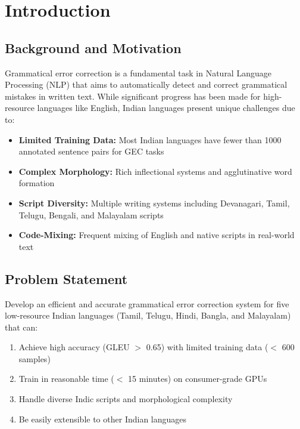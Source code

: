 \documentclass[12pt,a4paper]{article}
\begin{document}
\newpage

\section{Introduction}

\subsection{Background and Motivation}
Grammatical error correction is a fundamental task in Natural Language Processing (NLP) that aims to automatically detect and correct grammatical mistakes in written text. While significant progress has been made for high-resource languages like English, Indian languages present unique challenges due to:

\begin{itemize}
    \item \textbf{Limited Training Data:} Most Indian languages have fewer than 1000 annotated sentence pairs for GEC tasks
    \item \textbf{Complex Morphology:} Rich inflectional systems and agglutinative word formation
    \item \textbf{Script Diversity:} Multiple writing systems including Devanagari, Tamil, Telugu, Bengali, and Malayalam scripts
    \item \textbf{Code-Mixing:} Frequent mixing of English and native scripts in real-world text
\end{itemize}

\subsection{Problem Statement}
Develop an efficient and accurate grammatical error correction system for five low-resource Indian languages (Tamil, Telugu, Hindi, Bangla, and Malayalam) that can:
\begin{enumerate}
    \item Achieve high accuracy (GLEU $>$ 0.65) with limited training data ($<$ 600 samples)
    \item Train in reasonable time ($<$ 15 minutes) on consumer-grade GPUs
    \item Handle diverse Indic scripts and morphological complexity
    \item Be easily extensible to other Indian languages
\end{enumerate}
\end{document}
